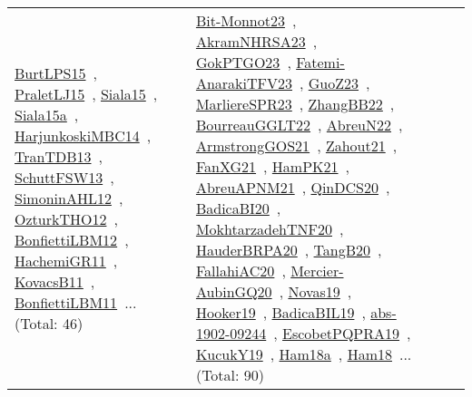 {\begin{longtable}{lp{3cm}>{\raggedright\arraybackslash}p{6cm}>{\raggedright\arraybackslash}p{6cm}>{\raggedright\arraybackslash}p{8cm}}
\href{../works/BurtLPS15.pdf}{BurtLPS15}~\cite{BurtLPS15}, \href{../works/PraletLJ15.pdf}{PraletLJ15}~\cite{PraletLJ15}, \href{../works/Siala15.pdf}{Siala15}~\cite{Siala15}, \href{../works/Siala15a.pdf}{Siala15a}~\cite{Siala15a}, \href{../works/HarjunkoskiMBC14.pdf}{HarjunkoskiMBC14}~\cite{HarjunkoskiMBC14}, \href{../works/TranTDB13.pdf}{TranTDB13}~\cite{TranTDB13}, \href{../works/SchuttFSW13.pdf}{SchuttFSW13}~\cite{SchuttFSW13}, \href{../works/SimoninAHL12.pdf}{SimoninAHL12}~\cite{SimoninAHL12}, \href{../works/OzturkTHO12.pdf}{OzturkTHO12}~\cite{OzturkTHO12}, \href{../works/BonfiettiLBM12.pdf}{BonfiettiLBM12}~\cite{BonfiettiLBM12}, \href{../works/HachemiGR11.pdf}{HachemiGR11}~\cite{HachemiGR11}, \href{../works/KovacsB11.pdf}{KovacsB11}~\cite{KovacsB11}, \href{../works/BonfiettiLBM11.pdf}{BonfiettiLBM11}~\cite{BonfiettiLBM11}... (Total: 46) & \href{../works/Bit-Monnot23.pdf}{Bit-Monnot23}~\cite{Bit-Monnot23}, \href{../works/AkramNHRSA23.pdf}{AkramNHRSA23}~\cite{AkramNHRSA23}, \href{../works/GokPTGO23.pdf}{GokPTGO23}~\cite{GokPTGO23}, \href{../works/Fatemi-AnarakiTFV23.pdf}{Fatemi-AnarakiTFV23}~\cite{Fatemi-AnarakiTFV23}, \href{../works/GuoZ23.pdf}{GuoZ23}~\cite{GuoZ23}, \href{../works/MarliereSPR23.pdf}{MarliereSPR23}~\cite{MarliereSPR23}, \href{../works/ZhangBB22.pdf}{ZhangBB22}~\cite{ZhangBB22}, \href{../works/BourreauGGLT22.pdf}{BourreauGGLT22}~\cite{BourreauGGLT22}, \href{../works/AbreuN22.pdf}{AbreuN22}~\cite{AbreuN22}, \href{../works/ArmstrongGOS21.pdf}{ArmstrongGOS21}~\cite{ArmstrongGOS21}, \href{../works/Zahout21.pdf}{Zahout21}~\cite{Zahout21}, \href{../works/FanXG21.pdf}{FanXG21}~\cite{FanXG21}, \href{../works/HamPK21.pdf}{HamPK21}~\cite{HamPK21}, \href{../works/AbreuAPNM21.pdf}{AbreuAPNM21}~\cite{AbreuAPNM21}, \href{../works/QinDCS20.pdf}{QinDCS20}~\cite{QinDCS20}, \href{../works/BadicaBI20.pdf}{BadicaBI20}~\cite{BadicaBI20}, \href{../works/MokhtarzadehTNF20.pdf}{MokhtarzadehTNF20}~\cite{MokhtarzadehTNF20}, \href{../works/HauderBRPA20.pdf}{HauderBRPA20}~\cite{HauderBRPA20}, \href{../works/TangB20.pdf}{TangB20}~\cite{TangB20}, \href{../works/FallahiAC20.pdf}{FallahiAC20}~\cite{FallahiAC20}, \href{../works/Mercier-AubinGQ20.pdf}{Mercier-AubinGQ20}~\cite{Mercier-AubinGQ20}, \href{../works/Novas19.pdf}{Novas19}~\cite{Novas19}, \href{../works/Hooker19.pdf}{Hooker19}~\cite{Hooker19}, \href{../works/BadicaBIL19.pdf}{BadicaBIL19}~\cite{BadicaBIL19}, \href{../works/abs-1902-09244.pdf}{abs-1902-09244}~\cite{abs-1902-09244}, \href{../works/EscobetPQPRA19.pdf}{EscobetPQPRA19}~\cite{EscobetPQPRA19}, \href{../works/KucukY19.pdf}{KucukY19}~\cite{KucukY19}, \href{../works/Ham18a.pdf}{Ham18a}~\cite{Ham18a}, \href{../works/Ham18.pdf}{Ham18}~\cite{Ham18}... (Total: 90)\\

\end{longtable}}

